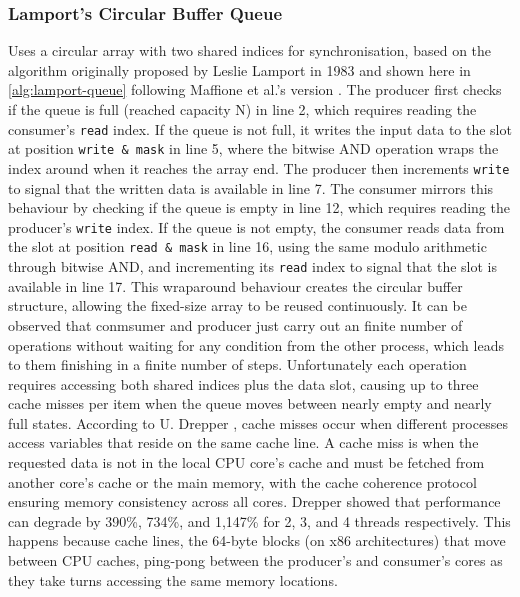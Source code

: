 \subsubsection{Lamport's Circular Buffer Queue}\label{subsubsec:lamport-circular-buffer-queue}
Uses a circular array with two shared indices for synchronisation, based on the algorithm originally proposed by Leslie Lamport in 1983 \cite{Lamport1983SPSCCircularBuffer} and shown here in \cref{alg:lamport-queue} following Maffione et al.'s version \cite{MaffioneCacheAware}. The producer first checks if the queue is full (reached capacity N) in line 2, which requires reading the consumer's \texttt{read} index. If the queue is not full, it writes the input data to the slot at position \texttt{write \& mask} in line 5, where the bitwise AND operation wraps the index around when it reaches the array end. The producer then increments \texttt{write} to signal that the written data is available in line 7. The consumer mirrors this behaviour by checking if the queue is empty in line 12, which requires reading the producer's \texttt{write} index. If the queue is not empty, the consumer reads data from the slot at position \texttt{read \& mask} in line 16, using the same modulo arithmetic through bitwise AND, and incrementing its \texttt{read} index to signal that the slot is available in line 17. This wraparound behaviour creates the circular buffer structure, allowing the fixed-size array to be reused continuously. It can be observed that conmsumer and producer just carry out an finite number of operations without waiting for any condition from the other process, which leads to them finishing in a finite number of steps. Unfortunately each operation requires accessing both shared indices plus the data slot, causing up to three cache misses per item when the queue moves between nearly empty and nearly full states. According to U. Drepper \cite{drepper2007every}, cache misses occur when different processes access variables that reside on the same cache line. A cache miss is when the requested data is not in the local CPU core's cache and must be fetched from another core's cache or the main memory, with the cache coherence protocol ensuring memory consistency across all cores. Drepper showed that performance can degrade by 390\%, 734\%, and 1,147\% for 2, 3, and 4 threads respectively. This happens because cache lines, the 64-byte blocks (on x86 architectures) that move between CPU caches, ping-pong between the producer's and consumer's cores as they take turns accessing the same memory locations.

